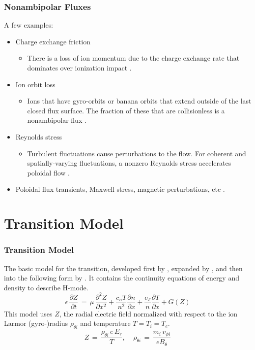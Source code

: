 \documentclass{beamer}
\begin{document}
\begin{frame}
\frametitle{Nonambipolar Fluxes}
A few examples:
\begin{itemize}
	\item Charge exchange friction
	\begin{itemize}
		\item There is a loss of ion momentum due to the charge exchange rate that dominates over ionization impact \parencite{toda_condensed_neutrals_1997}.
	\end{itemize}
	\item Ion orbit loss
	\begin{itemize}
		\item Ions that have gyro-orbits or banana orbits that extend outside of the last closed flux surface. The fraction of these that are collisionless is a nonambipolar flux \parencite{chankin_loss_1993}.
	\end{itemize}
	\item Reynolds stress
	\begin{itemize}
		\item Turbulent fluctuations cause perturbations to the flow. For coherent and spatially-varying fluctuations, a nonzero Reynolds stress accelerates poloidal flow \parencite{diamond_poloidal_1991}.
	\end{itemize}
\item Poloidal flux transients, Maxwell stress, magnetic perturbations, etc \parencite{staps_backstepping_2017}.
\end{itemize}
\end{frame}


\section{Transition Model}
\begin{frame}
\frametitle{Transition Model}
	The basic model for the transition, developed first by \textcite{itoh_edge_1991}, expanded by \textcite{zohm_dynamic_1994}, and then into the following form by \textcite{weymiens_bifurcation_2014}.
It contains the continuity equations of energy and density to describe H-mode.
\begin{equation*}
	\epsilon\,\frac{\partial Z}{\partial t} \,=\, \mu\,\frac{\partial^2 Z}{\partial x^2} + \frac{c_n T}{n^2} \frac{\partial n}{\partial x} + \frac{c_T}{n} \frac{\partial T}{\partial x} + G(Z)
	\label{eq:pde}
\end{equation*}
This model uses $Z$, the radial electric field normalized with respect to the ion Larmor (gyro-)radius $\rho_{\theta i}$ and temperature $T = T_i = T_e$.
\begin{equation*}
	Z \,=\, \frac{\rho_{\theta i} \, e \, E_r}{T}, ~~~~~ \rho_{\theta i} \,=\, \frac{m_i \, v_{\phi i}}{e B_\theta}
	\label{eq:normalization}
\end{equation*}
\end{frame}
\end{document}
